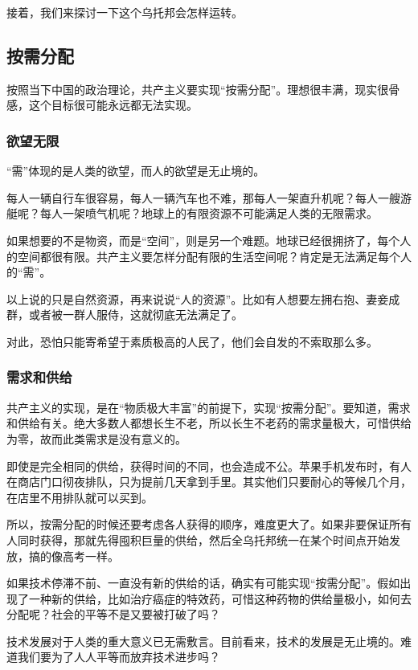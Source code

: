 接着，我们来探讨一下这个乌托邦会怎样运转。

\subsection{按需分配}

按照当下中国的政治理论，共产主义要实现“按需分配”。理想很丰满，现实很骨感，这个目标很可能永远都无法实现。

\subsubsection{欲望无限}

“需”体现的是人类的欲望，而人的欲望是无止境的。

每人一辆自行车很容易，每人一辆汽车也不难，那每人一架直升机呢？每人一艘游艇呢？每人一架喷气机呢？地球上的有限资源不可能满足人类的无限需求。

如果想要的不是物资，而是“空间”，则是另一个难题。地球已经很拥挤了，每个人的空间都很有限。共产主义要怎样分配有限的生活空间呢？肯定是无法满足每个人的“需”。

以上说的只是自然资源，再来说说“人的资源”。比如有人想要左拥右抱、妻妾成群，或者被一群人服侍，这就彻底无法满足了。

对此，恐怕只能寄希望于素质极高的人民了，他们会自发的不索取那么多。

\subsubsection{需求和供给}

共产主义的实现，是在“物质极大丰富”的前提下，实现“按需分配”。要知道，需求和供给有关。绝大多数人都想长生不老，所以长生不老药的需求量极大，可惜供给为零，故而此类需求是没有意义的。

即使是完全相同的供给，获得时间的不同，也会造成不公。苹果手机发布时，有人在商店门口彻夜排队，只为提前几天拿到手里。其实他们只要耐心的等候几个月，在店里不用排队就可以买到。

所以，按需分配的时候还要考虑各人获得的顺序，难度更大了。如果非要保证所有人同时获得，那就先得囤积巨量的供给，然后全乌托邦统一在某个时间点开始发放，搞的像高考一样。

如果技术停滞不前、一直没有新的供给的话，确实有可能实现“按需分配”。假如出现了一种新的供给，比如治疗癌症的特效药，可惜这种药物的供给量极小，如何去分配呢？社会的平等不是又要被打破了吗？

技术发展对于人类的重大意义已无需敷言。目前看来，技术的发展是无止境的。难道我们要为了人人平等而放弃技术进步吗？

